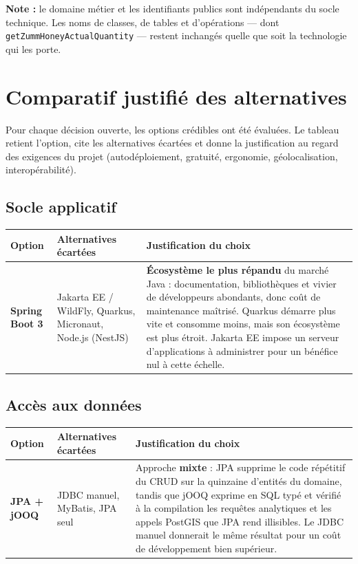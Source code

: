 \begin{encadre}
\textbf{Note :} le domaine métier et les identifiants publics sont indépendants
du socle technique. Les noms de classes, de tables et d'opérations --- dont
\texttt{getZummHoneyActualQuantity} --- restent inchangés quelle que soit la
technologie qui les porte.
\end{encadre}

\section{Comparatif justifié des alternatives}
Pour chaque décision ouverte, les options crédibles ont été évaluées. Le tableau
retient l'option, cite les alternatives écartées et donne la justification au
regard des exigences du projet (autodéploiement, gratuité, ergonomie,
géolocalisation, interopérabilité).

\subsection{Socle applicatif}
\begin{xltabular}{\textwidth}{>{\bfseries}p{2.7cm} p{4.2cm} X}
\toprule
\textbf{Option} & \textbf{Alternatives écartées} & \textbf{Justification du choix} \\
\midrule
\endhead
Spring Boot 3 & Jakarta EE / WildFly, Quarkus, Micronaut, Node.js (NestJS) & \textbf{Écosystème le plus répandu} du marché Java : documentation, bibliothèques et vivier de développeurs abondants, donc coût de maintenance maîtrisé. Quarkus démarre plus vite et consomme moins, mais son écosystème est plus étroit. Jakarta EE impose un serveur d'applications à administrer pour un bénéfice nul à cette échelle. \\
\bottomrule
\end{xltabular}

\subsection{Accès aux données}
\begin{xltabular}{\textwidth}{>{\bfseries}p{2.7cm} p{4.2cm} X}
\toprule
\textbf{Option} & \textbf{Alternatives écartées} & \textbf{Justification du choix} \\
\midrule
\endhead
JPA + jOOQ & JDBC manuel, MyBatis, JPA seul & Approche \textbf{mixte} : JPA supprime le code répétitif du CRUD sur la quinzaine d'entités du domaine, tandis que jOOQ exprime en SQL typé et vérifié à la compilation les requêtes analytiques et les appels PostGIS que JPA rend illisibles. Le JDBC manuel donnerait le même résultat pour un coût de développement bien supérieur. \\
\bottomrule
\end{xltabular}

